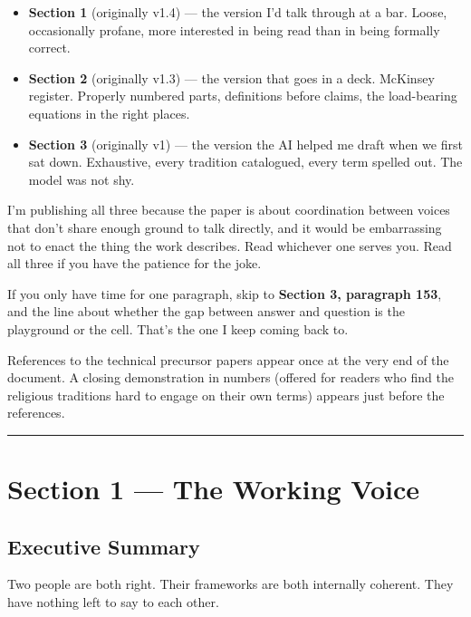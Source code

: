 \documentclass[
]{article}
\providecommand{\tightlist}{%
  \setlength{\itemsep}{0pt}\setlength{\parskip}{0pt}}
\begin{document}
\begin{itemize}
\tightlist
\item
  \textbf{Section 1} (originally v1.4) --- the version I'd talk through
  at a bar. Loose, occasionally profane, more interested in being read
  than in being formally correct.
\item
  \textbf{Section 2} (originally v1.3) --- the version that goes in a
  deck. McKinsey register. Properly numbered parts, definitions before
  claims, the load-bearing equations in the right places.
\item
  \textbf{Section 3} (originally v1) --- the version the AI helped me
  draft when we first sat down. Exhaustive, every tradition catalogued,
  every term spelled out. The model was not shy.
\end{itemize}

I'm publishing all three because the paper is about coordination between
voices that don't share enough ground to talk directly, and it would be
embarrassing not to enact the thing the work describes. Read whichever
one serves you. Read all three if you have the patience for the joke.

If you only have time for one paragraph, skip to \textbf{Section 3,
paragraph 153}, and the line about whether the gap between answer and
question is the playground or the cell. That's the one I keep coming
back to.

References to the technical precursor papers appear once at the very end
of the document. A closing demonstration in numbers (offered for readers
who find the religious traditions hard to engage on their own terms)
appears just before the references.

\begin{center}\rule{0.5\linewidth}{0.5pt}\end{center}

\section{Section 1 --- The Working
Voice}\label{section-1-the-working-voice}

\subsection{Executive Summary}\label{executive-summary}

Two people are both right. Their frameworks are both internally
coherent. They have nothing left to say to each other.
\end{document}
